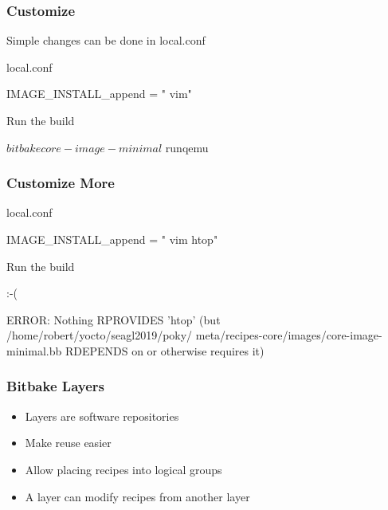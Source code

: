 \documentclass[aspectratio=169]{beamer}
\begin{document}
\begin{frame}[fragile]
\frametitle{Customize}
Simple changes can be done in local.conf
\begin{block}{local.conf}
\begin{semiverbatim}
IMAGE\_INSTALL\_append = " vim"
\end{semiverbatim}
\end{block}
\begin{block}{Run the build}
\begin{semiverbatim}
$ bitbake core-image-minimal
$ runqemu
\end{semiverbatim}
\end{block}
\end{frame}

\begin{frame}[fragile]
\frametitle{Customize More}
\begin{block}{local.conf}
\begin{semiverbatim}
IMAGE\_INSTALL\_append = " vim htop"
\end{semiverbatim}
\end{block}
\begin{block}{Run the build}
\end{block}
\pause
\begin{block}{:-(}
\begin{semiverbatim}
ERROR: Nothing RPROVIDES 'htop' (but /home/robert/yocto/seagl2019/poky/
meta/recipes-core/images/core-image-minimal.bb RDEPENDS on or otherwise
requires it)
\end{semiverbatim}
\end{block}
\end{frame}

\begin{frame}
\frametitle{Bitbake Layers}
\begin{itemize}
	\item Layers are software repositories
	\item Make reuse easier
	\item Allow placing recipes into logical groups
	\item A layer can modify recipes from another layer
\end{itemize}
\end{frame}
\end{document}
